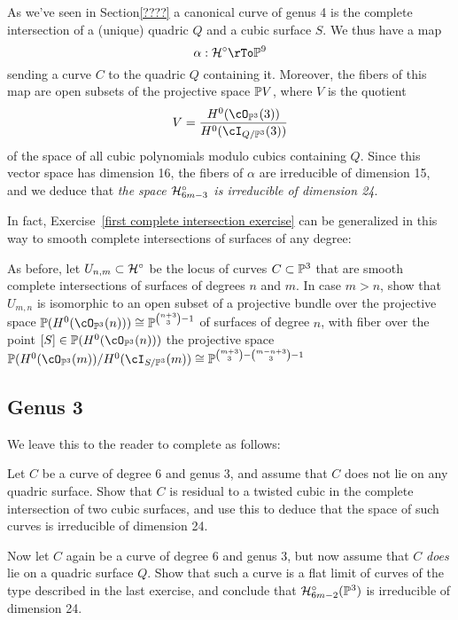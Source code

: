 As we've seen in Section\ref{????} a canonical curve of genus 4 is the complete intersection of a (unique) quadric $Q$ and a cubic surface $S$. We thus have a map
$$
\alpha : \cH^\circ \rTo \PP^9
$$
sending a curve $C$ to the quadric $Q$ containing it. Moreover, the fibers of this map are open subsets of the projective space $\PP V$, where $V$ is the quotient
$$
V = \frac{H^0(\cO_{\PP^3}(3))}{H^0(\cI_{Q/\PP^3}(3))}
$$
of the space of all cubic polynomials modulo cubics containing $Q$. Since this vector space has dimension 16, the fibers of $\alpha$ are irreducible of dimension 15, and we deduce that \emph{the space $\cH^\circ_{6m-3}$ is irreducible of dimension 24}.

In fact, Exercise~\ref{first complete intersection exercise} can be generalized in this way to smooth complete intersections of surfaces of any degree:

\begin{exercise}\label{second complete intersection exercise}
As before, let $U_{n,m} \subset \cH^\circ$ be the locus of curves $C \subset \PP^3$ that are smooth complete intersections of surfaces of degrees $n$ and $m$.
 In case $m > n$, show that $U_{m,n}$ is isomorphic to an open subset of a projective bundle over the projective space $\PP(H^0(\cO_{\PP^3}(n))) \cong \PP^{\binom{n+3}{3}-1}$ of surfaces of degree $n$, with fiber over the point $[S] \in \PP(H^0(\cO_{\PP^3}(n)))$ the projective space $\PP(H^0(\cO_{\PP^3}(m))/H^0(\cI_{S/\PP^3}(m)) \cong \PP^{\binom{m+3}{3} - \binom{m-n+3}{3} - 1}$ 
\end{exercise}


\subsection{Genus 3}
We leave this to the reader to complete as follows:

\begin{exercise}
Let $C$ be a curve of degree 6 and genus 3, and assume that $C$ does not lie on any quadric surface. Show that $C$ is residual to a twisted cubic in the complete intersection of two cubic surfaces, and use this to deduce that the space of such curves is irreducible of dimension 24.
\end{exercise}


\begin{exercise}
Now let $C$ again be a curve of degree 6 and genus 3, but now assume that $C$ \emph{does} lie on a quadric surface $Q$. Show that such a curve is a flat limit of curves of the type described in the last exercise, and conclude that $\cH^\circ_{6m-2}(\PP^3)$ is irreducible of dimension 24.  \end{exercise}



